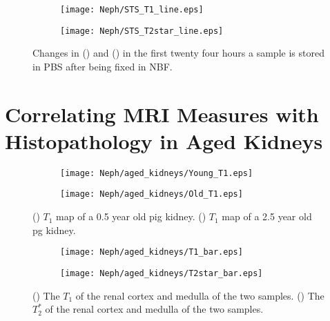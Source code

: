 \begin{figure}[H]
	\centering
	\begin{subfigure}[c]{0.47\textwidth}
		\centering
		\texttt{[image: Neph/STS\_T1\_line.eps]}
		\caption{}
		\label{fig:ex_fixation_t1_3t_sts}
	\end{subfigure}
	\hfill
	\begin{subfigure}[c]{0.47\textwidth}
		\centering
		\texttt{[image: Neph/STS\_T2star\_line.eps]}
		\caption{}
		\label{fig:ex_fixation_t2star_3t_sts}
	\end{subfigure}
	\caption{Changes in \tone () and \ttwostar () in the first twenty four hours a sample is stored in \ac{PBS} after being fixed in \ac{NBF}.}
	\label{fig:ex_fixation_sts}
\end{figure}

\section{Correlating MRI Measures with Histopathology in Aged Kidneys}

\begin{figure}[H]
	\centering
	\begin{subfigure}[c]{0.47\textwidth}
		\centering
		\texttt{[image: Neph/aged\_kidneys/Young\_T1.eps]}
		\caption{}
		\label{fig:ex_aged_t1_map}
	\end{subfigure}
	\hfill
	\begin{subfigure}[c]{0.47\textwidth}
		\centering
		\texttt{[image: Neph/aged\_kidneys/Old\_T1.eps]}
		\caption{}
		\label{fig:ex_aged_t2star_map}
	\end{subfigure}
	\caption{() $T_1$ map of a 0.5 year old pig kidney. () $T_1$ map of a 2.5 year old pg kidney.}
	\label{fig:ex_aged_map}
\end{figure}

\begin{figure}[H]
	\centering
	\begin{subfigure}[c]{0.47\textwidth}
		\centering
		\texttt{[image: Neph/aged\_kidneys/T1\_bar.eps]}
		\caption{}
		\label{fig:ex_aged_t1_bar}
	\end{subfigure}
	\hfill
	\begin{subfigure}[c]{0.47\textwidth}
		\centering
		\texttt{[image: Neph/aged\_kidneys/T2star\_bar.eps]}
		\caption{}
		\label{fig:ex_aged_t2star_bar}
	\end{subfigure}
	\caption{() The $T_1$ of the renal cortex and medulla of the two samples. () The $T_2^*$ of the renal cortex and medulla of the two samples.}
	\label{fig:ex_aged_bar}
\end{figure}

